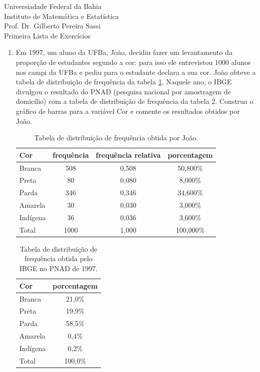\documentclass[12pt, a4paper]{article}
\begin{document}
\begin{center}
Universiadade Federal da Bahia\\
Instituto de Matemática e Estatística\\
Prof. Dr. Gilberto Pereira Sassi\\
\vspace{1cm}
Primeira Lista de Exercícios
\vspace{1cm}
\end{center}

\begin{enumerate}[1-]

	\item Em 1997, um aluno da UFBa, João, decidiu fazer um levantamento da proporção de estudantes segundo a cor: para isso ele entrevistou 1000 alunos nos campi da UFBa e pediu para o estudante declara a sua cor.
	João obteve a tabela de distribuição de frequência da tabela \ref{tabela_1}. Naquele ano, o IBGE divulgou o resultado do PNAD (pesquisa nacional por amostragem de domicílio) com a tabela de distribuição de 
	frequência da tabela 2. Construa o gráfico de barras para a variável Cor e comente os resultados obtidos por João.
	\begin{table}[ht]
	  \centering
	  \begin{tabular}{l|ccc}
	    \toprule[0.05cm]
	  Cor & frequência & frequência relativa & porcentagem \\ 
	    \midrule[0.05cm]
	  Branca & 508 & 0,508 & 50,800\% \\ 
	    Preta & 80 & 0,080 & 8,000\% \\ 
	    Parda & 346 & 0,346 & 34,600\% \\ 
	    Amarela & 30 & 0,030 & 3,000\% \\ 
	    Indígena & 36 & 0,036 & 3,600\% \\ \midrule[0.05cm]
	    Total & 1000 & 1,000 & 100,000\% \\ 
	    \bottomrule[0.05cm]
	  \end{tabular}
	  \caption{Tabela de distribuição de frequência obtida por João.} 
	  \label{tabela_1}
	\end{table}
	
	\begin{table}[ht]
	\centering
	\begin{tabular}{l|c}
	  \toprule[0.05cm]
	Cor & porcentagem \\ 
	  \midrule[0.05cm]
	Branca & 21,0\% \\ 
	  Preta & 19,9\% \\ 
	  Parda & 58,5\% \\ 
	  Amarela & 0,4\% \\ 
	  Indígena & 0,2\% \\ \midrule[0.05cm] 
	  Total & 100,0\% \\ 
	  \bottomrule[0.05cm]
	\end{tabular}
	\caption{Tabela de distribuição de frequência obtida pelo IBGE no PNAD de 1997.} 
	\label{tabela_2}
	\end{table}
	

\end{enumerate}
\end{document}
